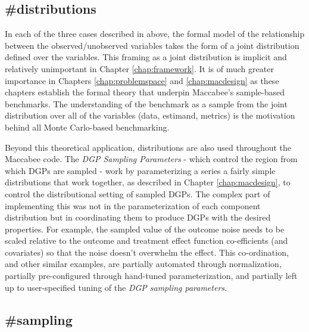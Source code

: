 \documentclass[./main.tex]{subfiles}
\begin{document}

\subsection{\textbf{\#distributions}}
\label{hc:distributions}

In each of the three cases described in  above, the formal model of the relationship between the observed/unobserved variables takes the form of a joint distribution defined over the variables. This framing as a joint distribution is implicit and relatively unimportant in Chapter \ref{chap:framework}. It is of much greater importance in Chapters \ref{chap:problemspace} and \ref{chap:macdesign} as these chapters establish the formal theory that underpin Maccabee's sample-based benchmarks. The understanding of the benchmark as a sample from the joint distribution over all of the variables (data, estimand, metrics) is the motivation behind all Monte Carlo-based benchmarking.

\vspace{\baselineskip}

Beyond this theoretical application, distributions are also used throughout the Maccabee code. The \textit{DGP Sampling Parameters} - which control the region from which DGPs are sampled - work by parameterizing a series a fairly simple distributions that work together, as described in Chapter \ref{chap:macdesign}, to control the distributional setting of sampled DGPs. The complex part of implementing this was not in the parameterization of each component distribution but in coordinating them to produce DGPs with the desired properties. For example, the sampled value of the outcome noise needs to be scaled relative to the outcome and treatment effect function co-efficients (and covariates) so that the noise doesn't overwhelm the effect. This co-ordination, and other similar examples, are partially automated through normalization, partially pre-configured through hand-tuned parameterization, and partially left up to user-specified tuning of the \textit{DGP sampling parameters}.


\subsection{\textbf{\#sampling}}
\label{hc:sampling}
\end{document}
